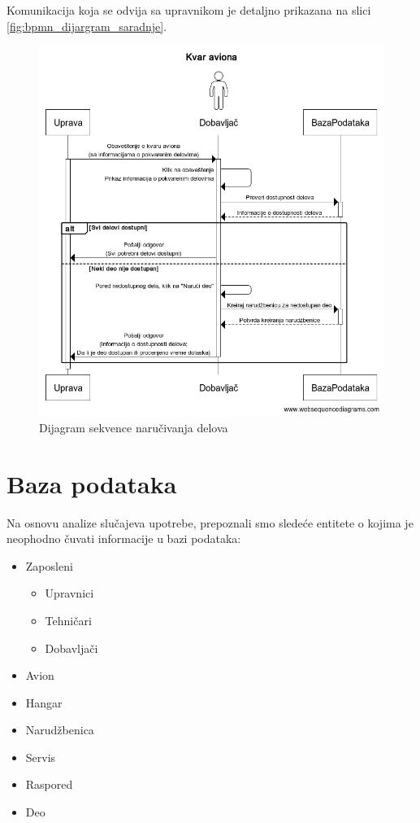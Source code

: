 \documentclass[a4paper]{article}
\begin{document}
Komunikacija koja se odvija sa upravnikom je detaljno prikazana na slici \ref{fig:bpmn_dijargram_saradnje}.
\begin{figure}[H]
\begin{center}
\includegraphics[scale=0.4]{Dijagrami/Dijagrami_sekvence/Dijagram_sekvenci_narucivanje_delova.png}
\end{center}
\caption{Dijagram sekvence naručivanja delova}
\label{fig:ds_narucivanje_delova}
\end{figure}

\section{Baza podataka}
\label{sec:baza_podataka}

Na osnovu analize slučajeva upotrebe, prepoznali smo sledeće entitete o kojima je neophodno čuvati informacije u bazi podataka:
\begin{itemize}
    \item Zaposleni
        \begin{itemize}[label=-]
            \item Upravnici
            \item Tehničari
            \item Dobavljači
        \end{itemize}
    \item Avion
    \item Hangar
    \item Narudžbenica
    \item Servis
    \item Raspored
    \item Deo
\end{itemize}
\end{document}
